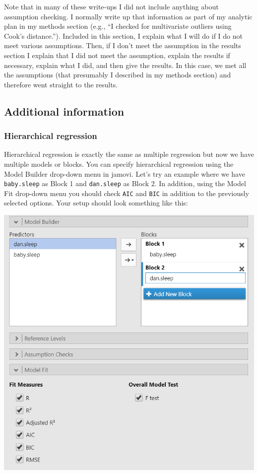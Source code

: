 \documentclass[
]{book}
\begin{document}
Note that in many of these write-ups I did not include anything about assumption checking. I normally write up that information as part of my analytic plan in my methods section (e.g., ``I checked for multivariate outliers using Cook's distance.''). Included in this section, I explain what I will do if I do not meet various assumptions. Then, if I don't meet the assumption in the results section I explain that I did not meet the assumption, explain the results if necessary, explain what I did, and then give the results. In this case, we met all the assumptions (that presumably I described in my methods section) and therefore went straight to the results.

\hypertarget{additional-information-5}{%
\subsection{Additional information}\label{additional-information-5}}

\hypertarget{hierarchical-regression}{%
\subsubsection{Hierarchical regression}\label{hierarchical-regression}}

Hierarchical regression is exactly the same as multiple regression but now we have multiple models or blocks. You can specify hierarchical regression using the Model Builder drop-down menu in jamovi. Let's try an example where we have \texttt{baby.sleep} as Block 1 and \texttt{dan.sleep} as Block 2. In addition, using the Model Fit drop-down menu you should check \texttt{AIC} and \texttt{BIC} in addition to the previously selected options. Your setup should look something like this:

\includegraphics{images/13-regression/hierarchical-setup.png}
\end{document}
